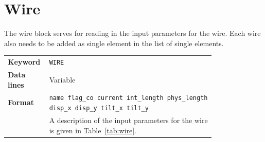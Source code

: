 \section{Wire} \label{sec:WIRE}

The wire block serves for reading in the input parameters for the wire.
Each wire also needs to be added as single element in the list of single elements.

\bigskip
\begin{tabular}{@{}lp{0.8\linewidth}}
    \textbf{Keyword}    & \texttt{WIRE}\index{WIRE} \\
    \textbf{Data lines} & Variable \\
    \textbf{Format}     & \texttt{name flag\_co current int\_length phys\_length disp\_x disp\_y tilt\_x tilt\_y} \\
                        & A description of the input parameters for the wire is given in Table~\ref{tab:wire}.
\end{tabular}

